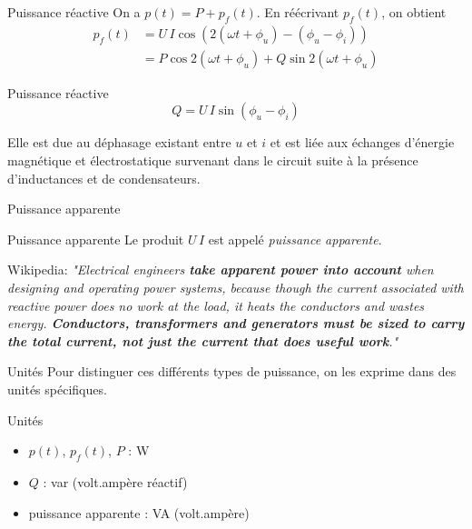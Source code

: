 	
	\begin{frame}{Puissance réactive}
		On a $p(t)=P+p_f(t)$. En réécrivant $p_f(t)$, on obtient
		\begin{align*}
			p_f(t)& = U\,I\cos (2(\omega t + \phi_u)-(\phi_u-\phi_i))\\
			& = P \cos 2(\omega t+\phi_u) + Q \sin 2(\omega t+\phi_u)
		\end{align*}
		
		\begin{block}{Puissance réactive}
		\[Q = U\,I\sin (\phi_u-\phi_i)\]

		
		Elle est due au déphasage existant
		entre $u$ et $i$ et est liée aux échanges d'énergie magnétique et
		électrostatique survenant dans le circuit suite à la présence
		d'inductances et de condensateurs. 
		\end{block}
		


	\end{frame}
	
	\begin{frame}{Puissance apparente}
	\begin{block}{Puissance apparente}
		Le produit $U\,I$ est appelé {\em puissance apparente}.
	\end{block}	

	\vfill
	
	Wikipedia: \textit{"Electrical engineers \textbf{take apparent power into account} when designing and operating power systems, because though the current associated with reactive power does no work at the load, it heats the conductors and wastes energy. \textbf{Conductors, transformers and generators must be sized to carry the total current, not just the current that does useful work}."}
	\end{frame}
	
	\begin{frame}{Unités}
		Pour distinguer ces différents types de puissance, on les exprime dans des unités spécifiques.
		\begin{block}{Unités}
			\begin{itemize}
				\item $p(t)$, $p_f(t)$, $P$ : W
				\item $Q$ : var (volt.ampère réactif)
				\item puissance apparente : VA (volt.ampère)
			\end{itemize}
		\end{block}
	\end{frame}

